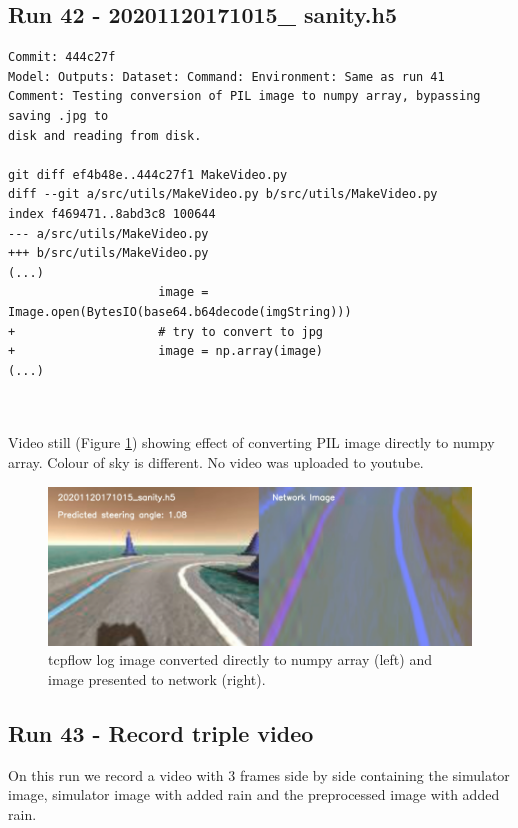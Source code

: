 \subsection{Run 42 - 20201120171015\_ sanity.h5}
\label{app_res:42}
\begin{verbatim}
Commit: 444c27f 
Model: Outputs: Dataset: Command: Environment: Same as run 41 
Comment: Testing conversion of PIL image to numpy array, bypassing saving .jpg to
disk and reading from disk.

git diff ef4b48e..444c27f1 MakeVideo.py
diff --git a/src/utils/MakeVideo.py b/src/utils/MakeVideo.py
index f469471..8abd3c8 100644
--- a/src/utils/MakeVideo.py
+++ b/src/utils/MakeVideo.py
(...)
                     image = Image.open(BytesIO(base64.b64decode(imgString)))
+                    # try to convert to jpg
+                    image = np.array(image)
(...)



\end{verbatim}

Video still (Figure \ref{fig:tcpflow_Run42}) showing effect of converting PIL image directly to numpy array. Colour of sky is different.
No video was uploaded to youtube.


\begin{figure}[h!]
\centering
\includegraphics[width=\textwidth]{Figures/tcpflow_Run42.png}
\caption{tcpflow log image converted directly to numpy array (left) and image presented to network (right).}
\label{fig:tcpflow_Run42}
\end{figure}




\subsection{Run 43 - Record triple video}
On this run we record a video with 3 frames side by side containing the simulator image, simulator image with added rain and the preprocessed image with added rain.

